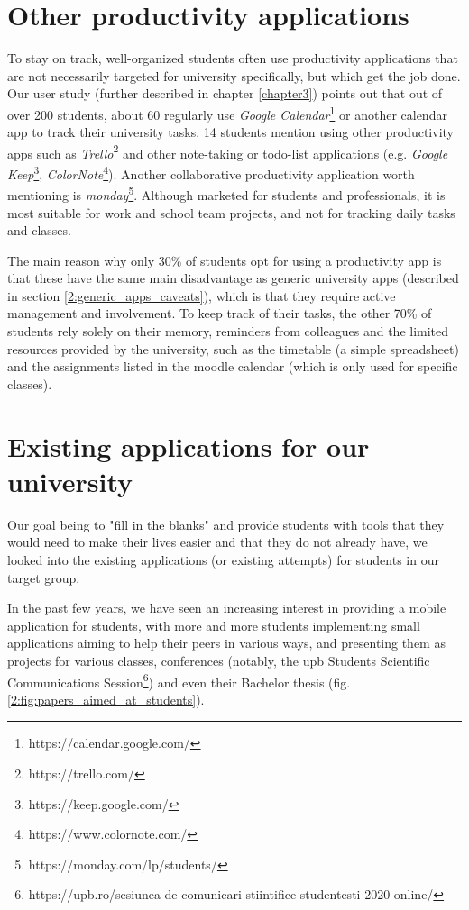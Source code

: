 \section{Other productivity applications} \label{2:other_apps}
    To stay on track, well-organized students often use productivity applications that are not necessarily targeted for university specifically, but which get the job done. Our user study (further described in chapter \ref{chapter3}) points out that out of over 200 students, about 60 regularly use \textit{Google Calendar}\footnote{https://calendar.google.com/} or another calendar app to track their university tasks. 14 students mention using other productivity apps such as \textit{Trello}\footnote{https://trello.com/} and other note-taking or todo-list applications (e.g. \textit{Google Keep}\footnote{https://keep.google.com/}, \textit{ColorNote}\footnote{https://www.colornote.com/}). Another collaborative productivity application worth mentioning is \textit{monday}\footnote{https://monday.com/lp/students/}. Although marketed for students and professionals, it is most suitable for work and school team projects, and not for tracking daily tasks and classes.
    
    The main reason why only 30\% of students opt for using a productivity app is that these have the same main disadvantage as generic university apps (described in section \ref{2:generic_apps_caveats}), which is that they require active management and involvement. To keep track of their tasks, the other 70\% of students rely solely on their memory, reminders from colleagues and the limited resources provided by the university, such as the timetable (a simple spreadsheet) and the assignments listed in the \gls{moodle} calendar (which is only used for specific classes).

\section{Existing applications for our university} \label{2:existing_apps}
    Our goal being to "fill in the blanks" and provide students with tools that they would need to make their lives easier and that they do not already have, we looked into the existing applications (or existing attempts) for students in our target group.
    
    In the past few years, we have seen an increasing interest in providing a mobile application for students, with more and more students implementing small applications aiming to help their peers in various ways, and presenting them as projects for various classes, conferences (notably, the \acrshort{upb} Students Scientific Communications Session\footnote{https://upb.ro/sesiunea-de-comunicari-stiintifice-studentesti-2020-online/}) and even their Bachelor thesis (fig. \ref{2:fig:papers_aimed_at_students}).
    
